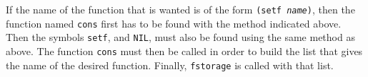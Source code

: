 If the name of the function that is wanted is of the form
\texttt{(setf \emph{name})}, then the function named \texttt{cons}
first has to be found with the method indicated above.  Then the 
symbols \texttt{setf}, and \texttt{NIL}, must also be found using the
same method as above.  The function \texttt{cons} must then be called
in order to build the list that gives the name of the desired
function.  Finally, \texttt{fstorage} is called with that list. 
